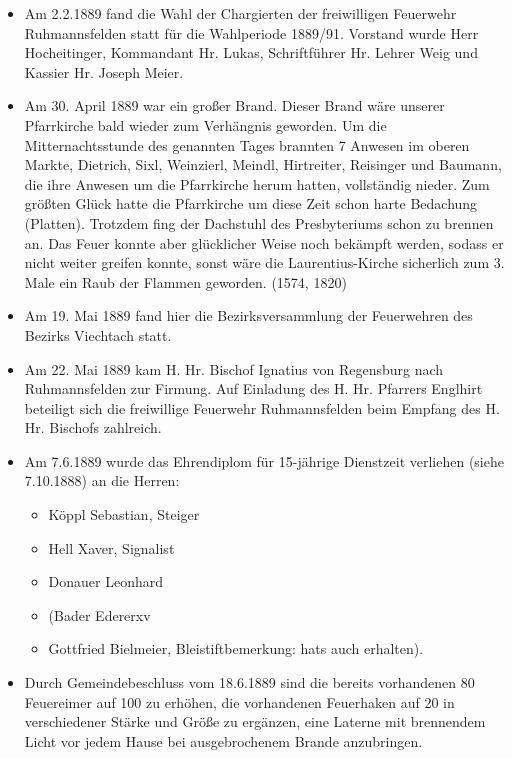 \documentclass[12pt,a4paper]{book}
\begin{document}
\begin{itemize}
\item Am 2.2.1889 fand die Wahl der Chargierten der freiwilligen Feuerwehr
Ruhmannsfelden statt für die Wahlperiode 1889/91. Vorstand wurde Herr
Hocheitinger, Kommandant Hr. Lukas, Schriftführer Hr. Lehrer Weig und Kassier
Hr. Joseph Meier.

\item Am 30. April 1889 war ein großer Brand. Dieser Brand wäre unserer
Pfarrkirche bald wieder zum Verhängnis geworden. Um die Mitternachtsstunde des
genannten Tages brannten 7 Anwesen im oberen Markte, Dietrich, Sixl, Weinzierl,
Meindl, Hirtreiter, Reisinger und Baumann, die ihre Anwesen um die Pfarrkirche
herum hatten, vollständig nieder. Zum größten Glück hatte die Pfarrkirche um
diese Zeit schon harte Bedachung (Platten). Trotzdem fing der Dachstuhl des
Presbyteriums schon zu brennen an. Das Feuer konnte aber glücklicher Weise noch
bekämpft werden, sodass er nicht weiter greifen konnte, sonst wäre die
Laurentius-Kirche sicherlich zum 3. Male ein Raub der Flammen geworden. (1574,
1820)

\item Am 19. Mai 1889 fand hier die Bezirksversammlung der Feuerwehren des
Bezirks Viechtach statt.

\item Am 22. Mai 1889 kam H. Hr. Bischof Ignatius von Regensburg nach
Ruhmannsfelden zur Firmung. Auf Einladung des H. Hr. Pfarrers Englhirt beteiligt
sich die freiwillige Feuerwehr Ruhmannsfelden beim Empfang des H. Hr. Bischofs
zahlreich.

\item Am 7.6.1889 wurde das Ehrendiplom für 15-jährige Dienstzeit verliehen
(siehe 7.10.1888) an die Herren:

\begin{itemize}
\item Köppl Sebastian, Steiger
\item Hell Xaver, Signalist
\item Donauer Leonhard
\item (Bader Edererxv
\item Gottfried Bielmeier, Bleistiftbemerkung: hats auch erhalten).
\end{itemize}

\item Durch Gemeindebeschluss vom 18.6.1889 sind die bereits vorhandenen 80
Feuereimer auf 100 zu erhöhen, die vorhandenen Feuerhaken auf 20 in
verschiedener Stärke und Größe zu ergänzen, eine Laterne mit brennendem Licht
vor jedem Hause bei ausgebrochenem Brande anzubringen.


\end{itemize}
\end{document}
